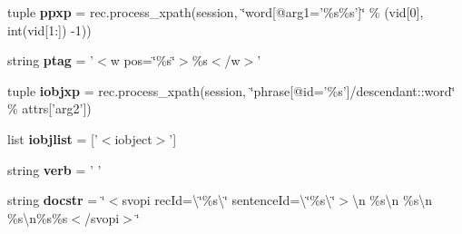 \begin{DoxyCompactItemize}
\item 
\hypertarget{classcheshire3_1_1textmining_1_1document_factory_1_1_enju_record_document_stream_ae13fdbbe1c1993e5c67d4fadddebccb1}{tuple {\bfseries ppxp} = rec.\-process\-\_\-xpath(session, \char`\"{}word\mbox{[}@arg1='\%s\%s'\mbox{]}\char`\"{} \% (vid\mbox{[}0\mbox{]}, int(vid\mbox{[}1\-:\mbox{]}) -\/1))}\label{classcheshire3_1_1textmining_1_1document_factory_1_1_enju_record_document_stream_ae13fdbbe1c1993e5c67d4fadddebccb1}

\item 
\hypertarget{classcheshire3_1_1textmining_1_1document_factory_1_1_enju_record_document_stream_ac7a3daf7f20d2ac8641f7172432b8dad}{string {\bfseries ptag} = '$<$w pos=\char`\"{}\%s\char`\"{}$>$\%s$<$/w$>$'}\label{classcheshire3_1_1textmining_1_1document_factory_1_1_enju_record_document_stream_ac7a3daf7f20d2ac8641f7172432b8dad}

\item 
\hypertarget{classcheshire3_1_1textmining_1_1document_factory_1_1_enju_record_document_stream_a2cd20595c12869ee873a118e6da3d71a}{tuple {\bfseries iobjxp} = rec.\-process\-\_\-xpath(session, \char`\"{}phrase\mbox{[}@id='\%s'\mbox{]}/descendant\-::word\char`\"{} \% attrs\mbox{[}'arg2'\mbox{]})}\label{classcheshire3_1_1textmining_1_1document_factory_1_1_enju_record_document_stream_a2cd20595c12869ee873a118e6da3d71a}

\item 
\hypertarget{classcheshire3_1_1textmining_1_1document_factory_1_1_enju_record_document_stream_ac2ab02de8b2b29e4a12198990b4ffb31}{list {\bfseries iobjlist} = \mbox{[}'$<$iobject$>$'\mbox{]}}\label{classcheshire3_1_1textmining_1_1document_factory_1_1_enju_record_document_stream_ac2ab02de8b2b29e4a12198990b4ffb31}

\item 
\hypertarget{classcheshire3_1_1textmining_1_1document_factory_1_1_enju_record_document_stream_a4b3760a149b1a86a4ab0a03709c9153a}{string {\bfseries verb} = ' '}\label{classcheshire3_1_1textmining_1_1document_factory_1_1_enju_record_document_stream_a4b3760a149b1a86a4ab0a03709c9153a}

\item 
\hypertarget{classcheshire3_1_1textmining_1_1document_factory_1_1_enju_record_document_stream_a38f697bf054ddb63d0a24a4e56d4fbb7}{string {\bfseries docstr} = \char`\"{}$<$svopi rec\-Id=\textbackslash{}\char`\"{}\%s\textbackslash{}\char`\"{} sentence\-Id=\textbackslash{}\char`\"{}\%s\textbackslash{}\char`\"{}$>$\textbackslash{}n \%s\textbackslash{}n \%s\textbackslash{}n \%s\textbackslash{}n\%s\%s$<$/svopi$>$\char`\"{}}\label{classcheshire3_1_1textmining_1_1document_factory_1_1_enju_record_document_stream_a38f697bf054ddb63d0a24a4e56d4fbb7}


\end{DoxyCompactItemize}
